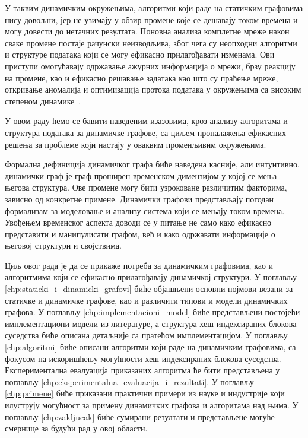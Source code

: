 У таквим динамичким окружењима, алгоритми који раде на статичким графовима нису довољни, јер не узимају у обзир промене које се дешавају током времена и могу довести до нетачних резултата. Поновна анализа комплетне мреже након сваке промене постаје рачунски неизводљива, због чега су неопходни алгоритми и структуре података који се могу ефикасно прилагођавати изменама. Ови приступи омогућавају одржавање ажурних информација о мрежи, брзу реакцију на промене, као и ефикасно решавање задатака као што су праћење мреже, откривање аномалија и оптимизација протока података у окружењима са високим степеном динамике~\cite{APPLICATIONS_OF_DYNAMIC_GRAPH}. 

У овом раду ћемо се бавити наведеним изазовима, кроз анализу алгоритама и структура података за динамичке графове, са циљем проналажења ефикасних решења за проблеме који настају у оваквим променљивим окружењима.

Формална дефиниција динамичког графа биће наведена касније, али интуитивно, динамички граф је граф проширен временском димензијом у којој се мења његова структура. Ове промене могу бити узроковане различитим факторима, зависно од конкретне примене. Динамички графови представљају погодан формализам за моделовање и анализу система који се мењају током времена. Увођењем временског аспекта доводи се у питање не само како ефикасно представити и манипулисати графом, већ и како одржавати информације о његовој структури и својствима.

Циљ овог рада је да се прикаже потреба за динамичким графовима, као и алгоритмима који се ефикасно прилагођавају динамичкој структури. У поглављу \ref{chp:staticki_i_dinamicki_grafovi} биће објашњени основни појмови везани за статичке и динамичке графове, као и различити типови и модели динамичких графова. У поглављу \ref{chp:implementacioni_model} биће представљени постојећи имплементациони модели из литературе, а структура хеш-индексираних блокова суседства биће описана детаљније са пратећом имплементацијом. У поглављу \ref{chp:algoritmi} биће описани алгоритми који раде на динамичким графовима, са фокусом на искоришћењу могућности хеш-индексираних блокова суседства. Експериментална евалуација приказаних алгоритма ће бити представљена у поглављу \ref{chp:eksperimentalna_evaluacija_i_rezultati}. У поглављу \ref{chp:primene} биће приказани практични примери из науке и индустрије који илуструју могућност за примену динамичких графова и алгоритама над њима. У поглављу \ref{chp:zakljucak} биће сумирани резултати и представљене могуће смернице за будући рад у овој области.

